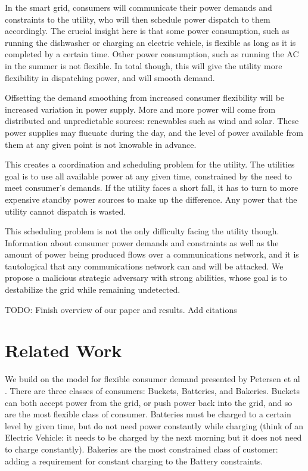 \documentclass[conference]{IEEEtran}
\begin{document}
In the smart grid, consumers will communicate their power demands and constraints to the utility, who will then schedule
power dispatch to them accordingly.  The crucial insight here is that some power consumption, such as running the dishwasher or charging an electric vehicle, is flexible as long as it is completed by a certain time.  Other power consumption, such as running the AC in the summer is not flexible.  In total though, this will give the utility more flexibility in dispatching power, and will smooth demand.

Offsetting the demand smoothing from increased consumer flexibility will be increased variation in power supply.  More and more power will come from distributed and unpredictable sources: renewables such as wind and solar.  These power supplies may flucuate during the day, and the level of power available from them at any given point is not knowable in advance.

This creates a coordination and scheduling problem for the utility.  The utilities goal is to use all available power at any
given time, constrained by the need to meet consumer's demands.  If the utility faces a short fall, it has to turn to more 
expensive standby power sources to make up the difference.  Any power that the utility cannot dispatch is wasted.

This scheduling problem is not the only difficulty facing the utility though.  Information about consumer power demands and constraints as well as the amount of power being produced flows over a communications network, and it is tautological that any communications network can and will be attacked.  We propose a malicious strategic adversary with strong abilities, whose goal is to destabilize the grid while remaining undetected. 

TODO: Finish overview of our paper and results.  Add citations

\section{Related Work}

We build on the model for flexible consumer demand presented by Petersen et al \cite{petersen2013taxonomy}.  There are three classes of consumers: Buckets, Batteries, and Bakeries.  Buckets can both accept power from the grid, or push power back into the grid, and so are the most flexible class of consumer.  Batteries must be charged to a certain level by given time, but do not need power constantly while charging (think of an Electric Vehicle: it needs to be charged by the next morning but it does not need to charge constantly).  Bakeries are the most constrained class of customer: adding a requirement for constant charging to the Battery constraints.
\end{document}
